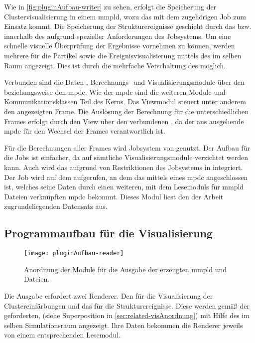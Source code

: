 Wie in \autoref{fig:pluginAufbau-writer} zu sehen, erfolgt die Speicherung der Clustervisualisierung in einem \gls{mmpld}, wozu das  mit dem zugehörigen Job zum Einsatz kommt. Die Speicherung der Strukturereignisse geschieht durch das  bzw. innerhalb des \SECalc aufgrund spezieller Anforderungen des  Jobsystems. Um eine schnelle visuelle Überprüfung der Ergebnisse vornehmen zu können, werden mehrere  für die Partikel sowie die Ereignisvisualisierung mittels des  im selben Raum angezeigt. Dies ist durch die mehrfache Verschaltung des  möglich.

Verbunden sind die Daten-, Berechnungs- und Visualisierungsmodule über den \SEDC beziehungsweise den \gls{mpdc}. Wie der \gls{mpdc} sind die weiteren Module und Kommunikationsklassen Teil des  Kerns. Das Viewmodul steuert unter anderem den angezeigten Frame. Die Auslösung der Berechnung für die unterschiedlichen Frames erfolgt durch den View über den verbundenen , da der aus \SECalc ausgehende \gls{mpdc} für den Wechsel der Frames verantwortlich ist.

Für die Berechnungen aller Frames wird Jobsystem von  genutzt. Der Aufbau für die Jobs ist einfacher, da auf sämtliche Visualisierungsmodule verzichtet werden kann. Auch wird das  aufgrund von Restriktionen des Jobsystems in \SECalc integriert. Der Job wird auf dem  aufgerufen, an dem das \SECalc mittels eines \gls{mpdc} angeschlossen ist, welches seine Daten durch einen weiteren, mit dem Lesemoduls für \gls{mmpld} Dateien verknüpften \gls{mpdc} bekommt. Dieses Modul liest den der Arbeit zugrundeliegenden Datensatz aus.

\subsection*{Programmaufbau für die Visualisierung}\label{sec:pluginaufbau-vis}
\begin{figure}
	\texttt{[image: pluginAufbau-reader]}
	\caption{Anordnung der  Module für die Ausgabe der erzeugten \gls{mmpld} und \MMSE Dateien.}\label{fig:pluginAufbau-reader}
\end{figure}

Die Ausgabe erfordert zwei Renderer. Den  für die Visualisierung der Clustereinfärbungen und das  für die Strukturereignisse. Diese werden gemäß der geforderten,  (siehe Superposition in \autoref{sec:related-visAnordnung}) mit Hilfe des  im selben Simulationsraum angezeigt. Ihre Daten bekommen die Renderer jeweils von einem entsprechenden Lesemodul. 

